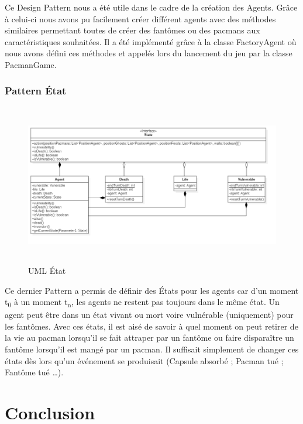 \documentclass[a4paper, 11pt]{article}
\begin{document}
Ce Design Pattern nous a été utile dans le cadre de la création des Agents. Grâce à celui-ci nous avons pu facilement créer différent agents avec des
méthodes similaires permettant toutes de créer des fantômes ou des pacmans aux caractéristiques souhaitées. Il a été implémenté grâce à la classe 
FactoryAgent où nous avons défini ces méthodes et appelés lors du lancement du jeu par la classe PacmanGame. \\

\section{Pattern État}

\begin{figure}[H]
  \begin{center}
  \includegraphics[height=7cm]{img/png/state}
  \end{center}
  \caption[schema]{UML État}
\end{figure}

Ce dernier Pattern a permis de définir des États pour les agents car d'un moment t\textsubscript{0} à un moment t\textsubscript{n}, les agents ne restent pas 
toujours dans le même état. Un agent peut être dans un état vivant ou mort voire vulnérable (uniquement) pour les fantômes. Avec ces états, 
il est aisé de savoir à quel moment on peut retirer de la vie au pacman lorsqu'il se fait attraper par un fantôme
ou faire disparaître un fantôme lorsqu'il est mangé par un pacman. Il suffisait simplement de changer ces états dès lors qu'un événement se 
produisait (Capsule absorbé ; Pacman tué ; Fantôme tué \ldots). 

\part*{Conclusion}
\end{document}
